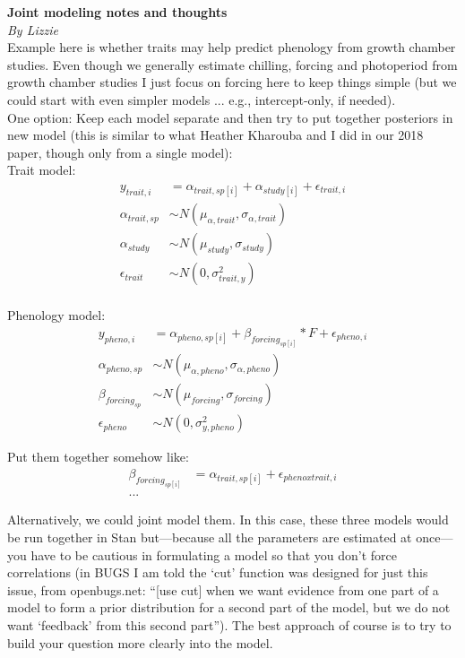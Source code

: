 \documentclass[11pt,letter]{article}
\begin{document}

\renewcommand{\refname}{\CHead{}}

{\bf Joint modeling notes and thoughts}\\
\emph{By Lizzie}\\

Example here is whether traits may help predict phenology from growth chamber studies. Even though we generally estimate chilling, forcing and photoperiod from growth chamber studies I just focus on forcing here to keep things simple (but we could start with even simpler models ... e.g., intercept-only, if needed).\\

One option: Keep each model separate and then try to put together posteriors in new model (this is similar to what Heather Kharouba and I did in our 2018 paper, though only from a single model):\\

Trait model:
\begin{align*}
y_{trait, i} &= \alpha_{trait, sp[i]} + \alpha_{study[i]} + \epsilon_{trait, i}\\
\alpha_{trait, sp} & \sim N(\mu_{\alpha, trait}, \sigma_{\alpha, trait}) \\
\alpha_{study}  & \sim N(\mu_{study}, \sigma_{study})\\
\epsilon_{trait} & \sim N(0,\sigma^2_{trait, y}) \\
\end{align*}

Phenology model:
\begin{align*}
y_{pheno, i} &= \alpha_{pheno, sp[i]} + \beta_{forcing_{sp[i]}}*F+ \epsilon_{pheno, i}\\
\alpha_{pheno, sp} & \sim N(\mu_{\alpha, pheno}, \sigma_{\alpha, pheno}) \\
\beta_{forcing_{sp}} & \sim N(\mu_{forcing}, \sigma_{forcing})\\
\epsilon_{pheno} & \sim N(0,\sigma^2_{y, pheno}) 
\end{align*}

Put them together somehow like:
\begin{align*}
\beta_{forcing_{sp[i]}} &= \alpha_{trait, sp[i]} + \epsilon_{pheno x trait, i}\\
...
\end{align*}

Alternatively, we could joint model them. In this case, these three models would be run together in Stan but---because all the parameters are estimated at once---you have to be cautious in formulating a model so that you don't force correlations (in BUGS I am told the `cut' function was designed for just this issue, from openbugs.net: ``[use cut] when we want evidence from one part of a model to form a prior distribution for a second part of the model, but we do not want `feedback' from this second part''). The best approach of course is to try to build your question more clearly into the model. \\
\end{document}
